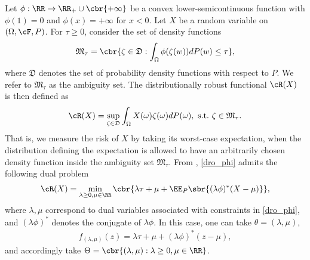 \documentclass[9pt]{article}
\numberwithin{equation}{section}
\begin{document}
\begin{example}\label{example_phi_divergence_dro}
Let $\phi: \RR \to \RR_+ \cup \cbr{+\infty}$ be a convex lower-semicontinuous function with $\phi(1)= 0$ and $\phi(x) = +\infty$ for $x < 0$.
Let $X$ be a random variable on $(\Omega, \cF, P)$.
For $\tau\geq 0$, consider the set of density functions 
\begin{align*}
    \mathfrak{M}_\tau = \cbr{
    \zeta \in \mathfrak{D}: \int_{\Omega} \phi(\zeta(w)) d P(w) \leq \tau
    },
\end{align*}
where $\mathfrak{D}$ denotes the set of probability density functions with respect to $P$.
We refer to $\mathfrak{M}_\tau$ as the ambiguity set. 
The distributionally robust functional $\cR(X)$ is then defined  as
\begin{align}\label{dro_phi}
    \cR(X) = \sup_{\zeta \in \mathfrak{D}} \int_{\Omega} X(\omega) \zeta(\omega) d P(\omega) , ~ \mathrm{s.t.}~ 
    \zeta \in \mathfrak{M}_\tau.
\end{align}
That is, we measure the risk of $X$ by taking its worst-case expectation, when the distribution defining the expectation is allowed to have an arbitrarily chosen density function inside the ambiguity set $\mathfrak{M}_\tau$.
From \cite{shapiro2017distributionally}, \eqref{dro_phi} admits the following dual problem 
\begin{align}\label{eq_phi_dro_f_form}
    \cR(X) = \min_{\lambda \geq 0, \mu \in \RR}
    \cbr{ \lambda \tau + \mu + 
    \EE_P \sbr{ (\lambda \phi)^* (X - \mu) } },
\end{align}
where $\lambda, \mu$ correspond to dual variables associated with constraints in \eqref{dro_phi},
and $(\lambda \phi)^*$ denotes the conjugate of $\lambda \phi$.
In this case, one can take $\theta = (\lambda, \mu)$,  
\begin{align*}
    f_{(\lambda, \mu)}(z) = \lambda \tau + \mu + (\lambda \phi)^* (z - \mu),
\end{align*}
and accordingly take $\Theta = \cbr{(\lambda, \mu): \lambda \geq 0, \mu \in \RR}$. 
\end{example}

\end{document}
